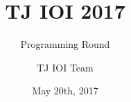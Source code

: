 \documentclass[a4paper,11pt]{scrartcl}
\begin{document}
\title{TJ IOI 2017}
\subtitle{Programming Round}
\date{May 20th, 2017}

\author{TJ IOI Team}
\end{document}
